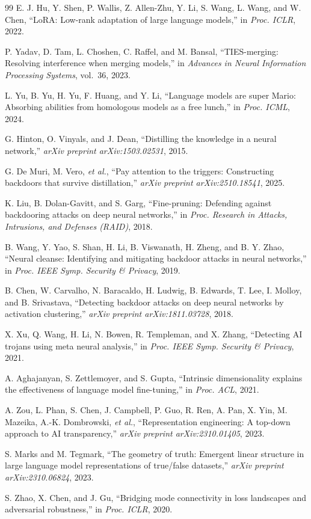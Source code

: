 \begin{thebibliography}{99}
E. J. Hu, Y. Shen, P. Wallis, Z. Allen-Zhu, Y. Li, S. Wang, L. Wang, and W. Chen, ``LoRA: Low-rank adaptation of large language models,'' in \textit{Proc. ICLR}, 2022.

P. Yadav, D. Tam, L. Choshen, C. Raffel, and M. Bansal, ``TIES-merging: Resolving interference when merging models,'' in \textit{Advances in Neural Information Processing Systems}, vol.\ 36, 2023.

L. Yu, B. Yu, H. Yu, F. Huang, and Y. Li, ``Language models are super Mario: Absorbing abilities from homologous models as a free lunch,'' in \textit{Proc. ICML}, 2024.

G. Hinton, O. Vinyals, and J. Dean, ``Distilling the knowledge in a neural network,'' \textit{arXiv preprint arXiv:1503.02531}, 2015.

G. De Muri, M. Vero, \textit{et al.}, ``Pay attention to the triggers: Constructing backdoors that survive distillation,'' \textit{arXiv preprint arXiv:2510.18541}, 2025.

K. Liu, B. Dolan-Gavitt, and S. Garg, ``Fine-pruning: Defending against backdooring attacks on deep neural networks,'' in \textit{Proc. Research in Attacks, Intrusions, and Defenses (RAID)}, 2018.

B. Wang, Y. Yao, S. Shan, H. Li, B. Viswanath, H. Zheng, and B. Y. Zhao, ``Neural cleanse: Identifying and mitigating backdoor attacks in neural networks,'' in \textit{Proc. IEEE Symp. Security \& Privacy}, 2019.

B. Chen, W. Carvalho, N. Baracaldo, H. Ludwig, B. Edwards, T. Lee, I. Molloy, and B. Srivastava, ``Detecting backdoor attacks on deep neural networks by activation clustering,'' \textit{arXiv preprint arXiv:1811.03728}, 2018.

X. Xu, Q. Wang, H. Li, N. Bowen, R. Templeman, and X. Zhang, ``Detecting AI trojans using meta neural analysis,'' in \textit{Proc. IEEE Symp. Security \& Privacy}, 2021.

A. Aghajanyan, S. Zettlemoyer, and S. Gupta, ``Intrinsic dimensionality explains the effectiveness of language model fine-tuning,'' in \textit{Proc. ACL}, 2021.

A. Zou, L. Phan, S. Chen, J. Campbell, P. Guo, R. Ren, A. Pan, X. Yin, M. Mazeika, A.-K. Dombrowski, \textit{et al.}, ``Representation engineering: A top-down approach to AI transparency,'' \textit{arXiv preprint arXiv:2310.01405}, 2023.

S. Marks and M. Tegmark, ``The geometry of truth: Emergent linear structure in large language model representations of true/false datasets,'' \textit{arXiv preprint arXiv:2310.06824}, 2023.

S. Zhao, X. Chen, and J. Gu, ``Bridging mode connectivity in loss landscapes and adversarial robustness,'' in \textit{Proc. ICLR}, 2020.

\end{thebibliography}
